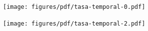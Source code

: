 \documentclass[a0,portrait]{a0poster} %
\begin{document}
\begin{multicols}{2}
\begin{figure}[H]
    \centering
    \begin{subfigure}[b]{0.49\linewidth}
    \texttt{[image: figures/pdf/tasa-temporal-0.pdf]}
    \end{subfigure}
    \begin{subfigure}[b]{0.49\linewidth}
    \texttt{[image: figures/pdf/tasa-temporal-2.pdf]}
    \end{subfigure}
    \label{fig:tasa-temporal-2}
\end{figure}









\end{multicols}
{ \footnotesize
}
\end{document}

